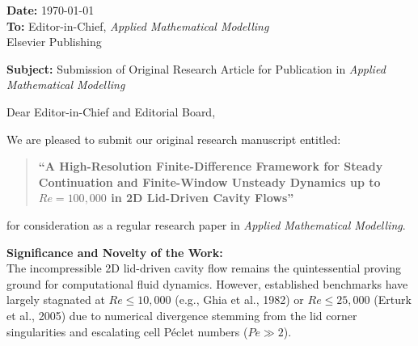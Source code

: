 \documentclass[11pt]{article}
\begin{document}
\noindent\textbf{Date:} \today \\
\textbf{To:} Editor-in-Chief, \textit{Applied Mathematical Modelling} \\
Elsevier Publishing

\vspace{1.5em}

\noindent\textbf{Subject:} Submission of Original Research Article for Publication in \textit{Applied Mathematical Modelling}

\vspace{1em}

\noindent Dear Editor-in-Chief and Editorial Board,

\vspace{0.8em}
We are pleased to submit our original research manuscript entitled:

\begin{quote}
\textbf{``A High-Resolution Finite-Difference Framework for Steady Continuation and Finite-Window Unsteady Dynamics up to $Re = 100{,}000$ in 2D Lid-Driven Cavity Flows''}
\end{quote}

\noindent for consideration as a regular research paper in \textit{Applied Mathematical Modelling}.

\vspace{0.8em}
\noindent\textbf{Significance and Novelty of the Work:} \\
The incompressible 2D lid-driven cavity flow remains the quintessential proving ground for computational fluid dynamics. However, established benchmarks have largely stagnated at $Re \le 10,000$ (e.g., Ghia et al., 1982) or $Re \le 25,000$ (Erturk et al., 2005) due to numerical divergence stemming from the lid corner singularities and escalating cell P\'eclet numbers ($Pe \gg 2$). 
\end{document}
